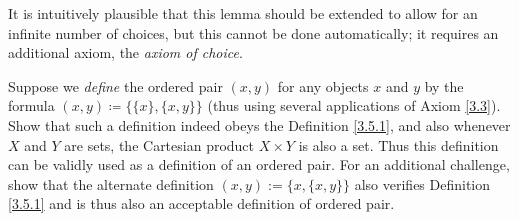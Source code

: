\begin{remark}\label{3.5.13}
It is intuitively plausible that this lemma should be extended to allow for an infinite number of choices, but this cannot be done automatically;
it requires an additional axiom, the \emph{axiom of choice}.
\end{remark}

\exercisesection

\begin{exercise}\label{ex 3.5.1}
Suppose we \emph{define} the ordered pair \((x, y)\) for any objects \(x\) and \(y\) by the formula \((x, y) \coloneqq \{\{x\}, \{x, y\}\}\)
(thus using several applications of Axiom \ref{3.3}).
Show that such a definition indeed obeys the Definition \ref{3.5.1}, and also whenever \(X\) and \(Y\) are sets, the Cartesian product \(X \times Y\) is also a set.
Thus this definition can be validly used as a definition of an ordered pair.
For an additional challenge, show that the alternate definition \((x, y) := \{x, \{x, y\}\}\) also verifies Definition \ref{3.5.1} and is thus also an acceptable definition of ordered pair.
\end{exercise}

